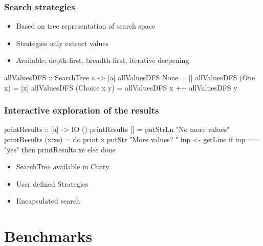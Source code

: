 \documentclass[
,hyperref={pdfpagelabels=false}
]{beamer}
\begin{document}
\begin{frame}[fragile]%
\frametitle{Search strategies}

\begin{itemize}
  \item Based on tree representation of search space
  \item Strategies only extract values
  \item Available: depth-first, breadth-first, iterative deepening
\end{itemize}


\begin{haskell}
allValuesDFS :: SearchTree a -> [a]
allValuesDFS None         = []
allValuesDFS (One      x) = [x]
allValuesDFS (Choice x y) = allValuesDFS x ++ allValuesDFS y
\end{haskell}

\end{frame}

\begin{frame}[fragile]%
\frametitle{Interactive exploration of the results}
\begin{haskell}
printResults :: [a] -> IO ()
printResults []     = putStrLn "No more values"
printResults (x:xs) = do print x
                         putStr "More values? "
                         inp <- getLine
                         if inp == "yes" then printResults xs
                                         else done
\end{haskell}
\begin{itemize}
\item SearchTree available in Curry
\item User defined Strategies
\item Encapsulated search
\end{itemize}
\end{frame}

\section{Benchmarks}
\end{document}
